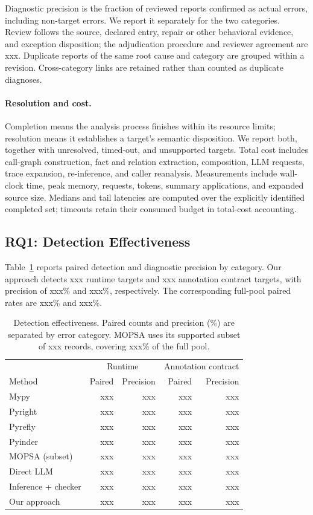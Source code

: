 Diagnostic precision is the fraction of reviewed reports confirmed as
actual errors, including non-target errors. We report it separately for
the two categories. Review follows the source, declared entry, repair or
other behavioral evidence, and exception disposition; the adjudication
procedure and reviewer agreement are xxx. Duplicate reports of the same
root cause and category are grouped within a revision. Cross-category
links are retained rather than counted as duplicate diagnoses.

\paragraph{Resolution and cost.}
Completion means the analysis process finishes within its resource limits;
resolution means it establishes a target's semantic disposition. We report
both, together with unresolved, timed-out, and unsupported targets.
Total cost includes call-graph construction, fact and relation extraction,
composition, LLM requests, trace expansion, re-inference, and caller
reanalysis. Measurements include wall-clock time, peak memory, requests,
tokens, summary applications, and expanded source size. Medians and tail
latencies are computed over the explicitly identified completed set;
timeouts retain their consumed budget in total-cost accounting.

\subsection{RQ1: Detection Effectiveness}
\label{sec:rq1}
Table~\ref{tab:detection} reports paired detection and diagnostic precision
by category. Our approach detects xxx runtime targets and xxx annotation
contract targets, with precision of xxx\% and xxx\%, respectively. The
corresponding full-pool paired rates are xxx\% and xxx\%.

\begin{table}[t]
\centering
\small
\setlength{\tabcolsep}{4pt}
\caption{Detection effectiveness. Paired counts and precision (\%) are separated by error category. MOPSA uses its supported subset of xxx records, covering xxx\% of the full pool.}
\label{tab:detection}
\begin{tabular}{lrrrr}
\toprule
& \multicolumn{2}{c}{Runtime} & \multicolumn{2}{c}{Annotation contract}\\
Method & Paired & Precision & Paired & Precision\\
\midrule
Mypy & xxx & xxx & xxx & xxx\\
Pyright & xxx & xxx & xxx & xxx\\
Pyrefly & xxx & xxx & xxx & xxx\\
Pyinder & xxx & xxx & xxx & xxx\\
MOPSA (subset) & xxx & xxx & xxx & xxx\\
Direct LLM & xxx & xxx & xxx & xxx\\
Inference + checker & xxx & xxx & xxx & xxx\\
Our approach & xxx & xxx & xxx & xxx\\
\bottomrule
\end{tabular}
\end{table}

